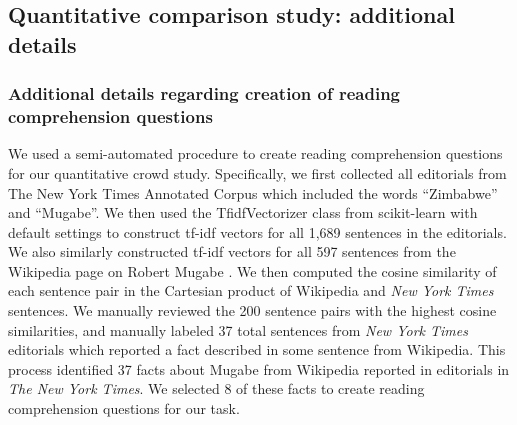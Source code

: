 \subsection*{Quantitative comparison study: additional details}

\subsubsection*{Additional details regarding creation of reading comprehension questions}
We used a semi-automated procedure to create reading comprehension questions for our quantitative crowd study.
Specifically, we first collected all editorials from The New York Times Annotated Corpus \cite{SandhausNYT} which included the words ``Zimbabwe'' and ``Mugabe''.
We then used the TfidfVectorizer class from scikit-learn \cite{Pedregosa:2011:SML:1953048.2078195} with default settings to construct tf-idf vectors for all 1,689 sentences in the editorials. 
We also similarly constructed tf-idf vectors for all 597 sentences from the Wikipedia page on Robert Mugabe \cite{wikimugabe}. 
We then computed the cosine similarity of each sentence pair in the Cartesian product of Wikipedia and \textit{New York Times} sentences. We manually reviewed the 200 sentence pairs with the highest cosine similarities, and manually labeled 37 total sentences from \textit{New York Times} editorials which reported a fact described in some sentence from Wikipedia.
This process identified 37 facts about Mugabe from Wikipedia reported in editorials in \textit{The New York Times}. 
We selected 8 of these facts to create reading comprehension questions for our task.



